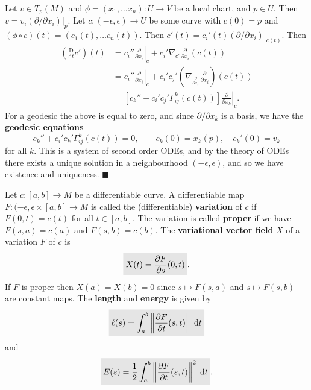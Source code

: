 \documentclass[letter-paper]{tufte-book}
\newenvironment{proof}[1][Proof]{\begin{trivlist}
\item[\hskip \labelsep {\bfseries #1}]}{\end{trivlist}}
\newcommand{\qed}{\hfill$\blacksquare$}
\newcommand{\highlight}[1]{\mathchoice%
  {\colorbox{black!10}{$\displaystyle#1$}}%
  {\colorbox{black!10}{$\textstyle#1$}}%
  {\colorbox{black!10}{$\scriptstyle#1$}}%
  {\colorbox{black!10}{$\scriptscriptstyle#1$}}}%
\begin{document}
\begin{proof}
  Let $v\in T_p(M)$ and $\phi = (x_1, \ldots x_n): U \to V$ be a local chart, and $p\in U$. Then $v = v_i (\partial/\partial x_i)|_p$. Let $c:(-\epsilon, \epsilon) \to U$ be some curve with $c(0) = p$ and $(\phi \circ c)(t) = (c_1(t), \ldots c_n(t))$. Then $c'(t) = c_i'(t) (\partial/\partial x_i)|_{c(t)}$. Then
  \begin{align*}
    \left(\frac{\mathrm{D}}{\mathrm{d}t} c'\right)(t) 
      &= c_i'' \left.\frac{\partial}{\partial x_i}\right|_c + c_i' \nabla_{c'}\frac{\partial}{\partial x_i}(c(t))\\
      &= c_i'' \left.\frac{\partial}{\partial x_i}\right|_c + c_i' c_j' \left( \nabla_{\frac{\partial}{\partial x_j}} \frac{\partial}{\partial x_i}\right) (c(t))\\
      &= \left[c_k'' + c_i' c_j' \Gamma_{ij}^k (c(t))\right] \left.\frac{\partial}{\partial x_k}\right|_c.
  \end{align*}
  For a geodesic the above is equal to zero, and since $\partial / \partial x_k$ is a basis, we have the \textbf{geodesic equations}
  \begin{equation*}
    c_k'' + c_i' c_k' \Gamma_{ij}^k(c(t)) = 0, \qquad c_k(0) = x_k(p), \quad c_k'(0) = v_k
  \end{equation*}
  for all $k$. This is a system of second order ODEs, and by the theory of ODEs there exists a unique solution in a neighbourhood $(-\epsilon, \epsilon)$, and so we have existence and uniqueness. \qed
\end{proof}

Let $c:[a,b] \to M$ be a differentiable curve. A differentiable map $F: (-\epsilon, \epsilon \times [a,b] \to M$ is called the (differentiable) \textbf{variation} of $c$ if $F(0,t) = c(t)$ for all $t\in [a,b]$. The variation is called \textbf{proper} if we have $F(s,a) = c(a)$ and $F(s,b) = c(b)$. The \textbf{variational vector field} $X$ of a variation $F$ of $c$ is
\begin{equation}
  \highlight{X(t) = \frac{\partial F}{\partial s}(0, t)}.
\end{equation}
If $F$ is proper then $X(a) = X(b) = 0$ since $s \mapsto F(s,a)$ and $s\mapsto F(s, b)$ are constant maps. The \textbf{length} and \textbf{energy} is given by
\begin{equation}
  \highlight{ \ell(s) = \int_a^b \left\| \frac{\partial F}{\partial t}(s,t) \right\|\; \mathrm{d}t }
\end{equation}
and
\begin{equation}
  \highlight{ E(s) = \frac{1}{2}\int_a^b \left\| \frac{\partial F}{\partial t}(s,t) \right\|^2\; \mathrm{d}t }.
\end{equation}
\end{document}
